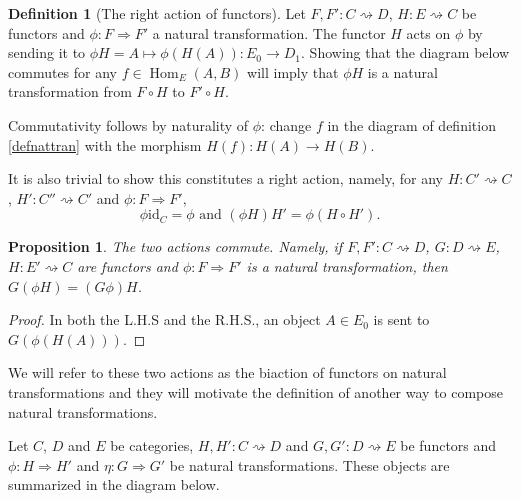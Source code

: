 \documentclass{article}
\newtheorem{prop}[thm]{Proposition}
\theoremstyle{definition}
\newtheorem{defn}[thm]{Definition}
\theoremstyle{remark}
\DeclareMathOperator{\Hom}{Hom}
\newcommand{\id}{\text{id}}
\begin{document}
\begin{defn}[The right action of functors]
	Let $F,F':C\rightsquigarrow D$, $H:E\rightsquigarrow C$ be functors and $\phi:F\Rightarrow F'$ a natural transformation. The functor $H$ acts on $\phi$ by sending it to $\phi H = A \mapsto \phi(H(A)) : E_0 \rightarrow D_1$. Showing that the diagram below commutes for any $f \in \Hom_E(A,B)$ will imply that $\phi H$ is a natural transformation from $F\circ H$ to $F'\circ H$.
	\begin{figure}[h]
		\centering
	\end{figure}

	Commutativity follows by naturality of $\phi$: change $f$ in the diagram of definition \ref{defnattran} with the morphism $H(f):H(A) \rightarrow H(B)$.
	
	It is also trivial to show this constitutes a right action, namely, for any $H:C'\rightsquigarrow C$, $H':C''\rightsquigarrow C'$ and $\phi:F\Rightarrow F'$,
	\[\phi \id_C = \phi \text{ and } (\phi H)H' = \phi(H \circ H').\]
\end{defn}

\begin{prop}
	The two actions commute. Namely, if $F,F':C\rightsquigarrow D$, $G: D\rightsquigarrow E$, $H: E'\rightsquigarrow C$ are functors and $\phi:F \Rightarrow F'$ is a natural transformation, then $G(\phi H) = (G\phi) H$.
\end{prop}
\begin{proof}
In both the L.H.S and the R.H.S., an object $A \in E_0$ is sent to $G(\phi(H(A)))$.
\end{proof}
We will refer to these two actions as the biaction of functors on natural transformations and they will motivate the definition of another way to compose natural transformations.

Let $C$, $D$ and $E$ be categories, $H,H': C\rightsquigarrow D$ and $G,G':D \rightsquigarrow E$ be functors and $\phi:H\Rightarrow H'$ and $\eta:G\Rightarrow G'$ be natural transformations. These objects are summarized in the diagram below.
\begin{figure}[h]
	\centering
\end{figure}
\end{document}
